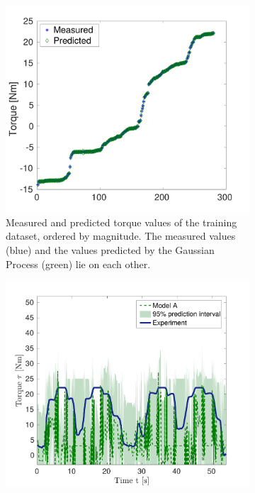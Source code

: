 \begin{figure}%
  \centering%
  \begin{subfigure}[t]{0.48\textwidth}%
    \centering%
    \includegraphics[width=\textwidth]{images/summer_school_study/measured_optimized_torque_A2.pdf}%
    \caption{Measured and predicted torque values of the training dataset, ordered by magnitude. The measured values (blue) and the values predicted by the Gaussian Process (green) lie on each other.}%
    \label{fig:measured_optimized_torque_A2}%
  \end{subfigure}%
  \quad
  \begin{subfigure}[t]{0.48\textwidth}%
    \centering%
    \includegraphics[width=\textwidth]{images/summer_school_study/validation_bv5_40_points_only_gamma_for_training.pdf}%

\end{subfigure}
\end{figure}
